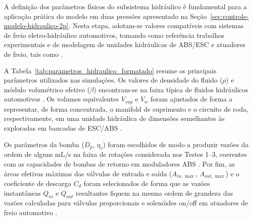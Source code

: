 A definição dos parâmetros físicos do subsistema hidráulico é fundamental para a aplicação prática do modelo em duas pressões apresentado na Seção~\ref{sec:controle-modelo-hidraulico-2p}. Nesta etapa, adotam-se valores compatíveis com sistemas de freio eletro-hidráulico automotivos, tomando como referência trabalhos experimentais e de modelagem de unidades hidráulicas de ABS/ESC e atuadores de freio, tais como .

A Tabela~\ref{tab:parametros_hidraulico_formatado} resume os principais parâmetros utilizados nas simulações. Os valores de densidade do fluido ($\rho$) e módulo volumétrico efetivo ($\beta$) encontram-se na faixa típica de fluidos hidráulicos automotivos \cite{Lv2014}. Os volumes equivalentes $V_{sup}$ e $V_w$ foram ajustados de forma a representar, de forma concentrada, o manifold de suprimento e o circuito de roda, respectivamente, em uma unidade hidráulica de dimensões semelhantes às exploradas em bancadas de ESC/ABS \cite{ZengYangHuang2023}. 

Os parâmetros da bomba ($D_p$, $\eta_v$) foram escolhidos de modo a produzir vazões da ordem de alguns mL/s na faixa de rotações considerada nos Testes 1–3, coerentes com as capacidades de bombas de retorno em moduladores ABS \cite{MotorParametricDesign2023}. Por fim, as áreas efetivas máximas das válvulas de entrada e saída ($A_{in,\max}$, $A_{out,\max}$) e o coeficiente de descarga $C_d$ foram selecionados de forma que as vazões instantâneas $Q_{in}$ e $Q_{out}$ resultantes fiquem na mesma ordem de grandeza das vazões calculadas para válvulas proporcionais e solenóides on/off em atuadores de freio automotivo \cite{ProportionalPressureABS2023,ChenLv2017}.


